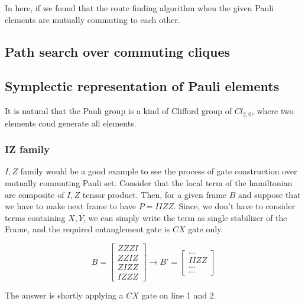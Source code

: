 \documentclass[a4paper,12pt]{article}
\begin{document}
In here, if we found that the route finding algorithm
when the given Pauli elements are mutually commuting to each other.

\subsection{Path search over commuting cliques}

\subsection{Symplectic representation of Pauli elements}

It is natural that the Pauli group is a kind of Clifford group of $Cl_{2,0}$,
where two elements coud generate all elements.

\subsubsection{IZ family}

$I, Z$ family would be a good example to see the process of gate construction
over mutually commuting Pauli set.
Consider that the local term of the hamiltonian are composite of $I, Z$ tensor product.
Then, for a given frame $B$ and suppose that we have to make next frame to have $P = IIZZ$.
Since, we don't have to consider terms containing $X, Y$, we can simply write the term 
as single stabilizer of the Frame, and the required entanglement gate is $CX$ gate only.

\begin{equation}
    B = \begin{bmatrix}
        ZZZI\\
        ZZIZ\\
        ZIZZ\\
        IZZZ
    \end{bmatrix}
    \rightarrow B' = \begin{bmatrix}
        \dots\\
        IIZZ\\
        \dots\\
        \dots
    \end{bmatrix}
\end{equation}

The answer is shortly applying a $CX$ gate on line 1 and 2.
\end{document}
